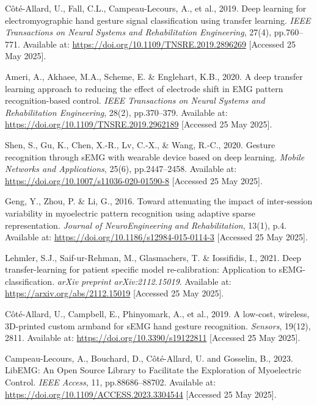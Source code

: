 \begin{multicols}{2}
\begin{thebibliography}{99}
Côté-Allard, U., Fall, C.L., Campeau-Lecours, A., et al., 2019. Deep learning for electromyographic hand gesture signal classification using transfer learning. \textit{IEEE Transactions on Neural Systems and Rehabilitation Engineering}, 27(4), pp.760–771. Available at: \url{https://doi.org/10.1109/TNSRE.2019.2896269} [Accessed 25 May 2025].

Ameri, A., Akhaee, M.A., Scheme, E. \& Englehart, K.B., 2020. A deep transfer learning approach to reducing the effect of electrode shift in EMG pattern recognition-based control. \textit{IEEE Transactions on Neural Systems and Rehabilitation Engineering}, 28(2), pp.370–379. Available at: \url{https://doi.org/10.1109/TNSRE.2019.2962189} [Accessed 25 May 2025].

Shen, S., Gu, K., Chen, X.-R., Lv, C.-X., \& Wang, R.-C., 2020. Gesture recognition through sEMG with wearable device based on deep learning. \textit{Mobile Networks and Applications}, 25(6), pp.2447–2458. Available at: \url{https://doi.org/10.1007/s11036-020-01590-8} [Accessed 25 May 2025].

Geng, Y., Zhou, P. \& Li, G., 2016. Toward attenuating the impact of inter-session variability in myoelectric pattern recognition using adaptive sparse representation. \textit{Journal of NeuroEngineering and Rehabilitation}, 13(1), p.4. Available at: \url{https://doi.org/10.1186/s12984-015-0114-3} [Accessed 25 May 2025].

Lehmler, S.J., Saif-ur-Rehman, M., Glasmachers, T. \& Iossifidis, I., 2021. Deep transfer-learning for patient specific model re-calibration: Application to sEMG-classification. \textit{arXiv preprint arXiv:2112.15019}. Available at: \url{https://arxiv.org/abs/2112.15019} [Accessed 25 May 2025].

Côté-Allard, U., Campbell, E., Phinyomark, A., et al., 2019. A low-cost, wireless, 3D-printed custom armband for sEMG hand gesture recognition. \textit{Sensors}, 19(12), 2811. Available at: \url{https://doi.org/10.3390/s19122811} [Accessed 25 May 2025].

Campeau-Lecours, A., Bouchard, D., Côté-Allard, U. and Gosselin, B., 2023. LibEMG: An Open Source Library to Facilitate the Exploration of Myoelectric Control. \textit{IEEE Access}, 11, pp.88686–88702. Available at: \url{https://doi.org/10.1109/ACCESS.2023.3304544} [Accessed 25 May 2025].


\end{thebibliography}
\end{multicols}

